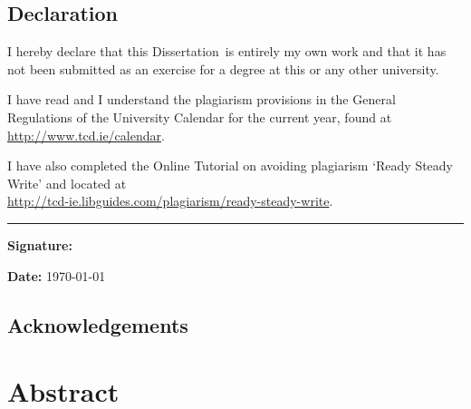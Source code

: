 \documentclass[a4paper,oneside,12pt]{book}
\title{\thesistitle}
\author{\authorname}
\newcommand{\typeofthesis}{Dissertation} %
\begin{document}

\doublespacing

\newpage

\section*{Declaration}
I hereby declare that this \typeofthesis\ is entirely my own work and that it has not been submitted as an exercise for a degree at this or any other university.

I have read and I understand the plagiarism provisions in the General Regulations of the University Calendar for the current year, found at\\
 \url{http://www.tcd.ie/calendar}.

I have also completed the Online Tutorial on avoiding plagiarism `Ready Steady Write' and located at \\
 \url{http://tcd-ie.libguides.com/plagiarism/ready-steady-write}.

\vspace{.3cm}
\rule{10cm}{.3pt}

\begin{flushleft}
	\begin{minipage}{0.5\linewidth}
		\textbf{Signature:} 
	\end{minipage}
\end{flushleft}
\textbf{Date: } \today
\vspace{.3cm}

\newpage

\section*{Acknowledgements}

\chapter{Abstract}


\newpage

\newpage \tableofcontents
\newpage \listoffigures
\newpage \listoftables

\newpage

\vspace{2cm}

\mainmatter








\appendix
\renewcommand{\thechapter}{A\arabic{chapter}}
\end{document}
